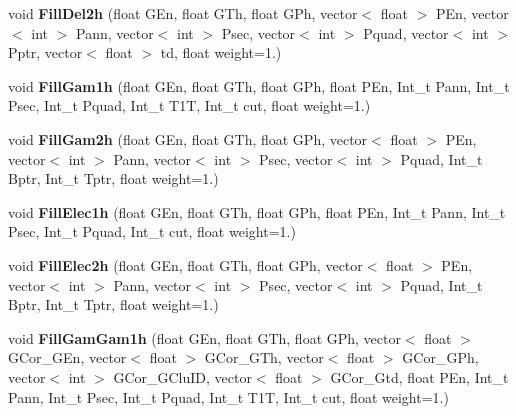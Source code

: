 \begin{DoxyCompactItemize}
\item 
\mbox{\label{classhists_a2129f29167f7fdb68978412d81030844}} 
void {\bfseries Fill\+Del2h} (float G\+En, float G\+Th, float G\+Ph, vector$<$ float $>$ P\+En, vector$<$ int $>$ Pann, vector$<$ int $>$ Psec, vector$<$ int $>$ Pquad, vector$<$ int $>$ Pptr, vector$<$ float $>$ td, float weight=1.)
\item 
\mbox{\label{classhists_af555a97407e075689f176db774c87da3}} 
void {\bfseries Fill\+Gam1h} (float G\+En, float G\+Th, float G\+Ph, float P\+En, Int\+\_\+t Pann, Int\+\_\+t Psec, Int\+\_\+t Pquad, Int\+\_\+t T1T, Int\+\_\+t cut, float weight=1.)
\item 
\mbox{\label{classhists_a37e85d4eeab8262c6809d003d83d220e}} 
void {\bfseries Fill\+Gam2h} (float G\+En, float G\+Th, float G\+Ph, vector$<$ float $>$ P\+En, vector$<$ int $>$ Pann, vector$<$ int $>$ Psec, vector$<$ int $>$ Pquad, Int\+\_\+t Bptr, Int\+\_\+t Tptr, float weight=1.)
\item 
\mbox{\label{classhists_a5c04c8d7cdb40e45f7ba00464c6835e1}} 
void {\bfseries Fill\+Elec1h} (float G\+En, float G\+Th, float G\+Ph, float P\+En, Int\+\_\+t Pann, Int\+\_\+t Psec, Int\+\_\+t Pquad, Int\+\_\+t cut, float weight=1.)
\item 
\mbox{\label{classhists_a1734b966a54b280c42524291ddcd60c8}} 
void {\bfseries Fill\+Elec2h} (float G\+En, float G\+Th, float G\+Ph, vector$<$ float $>$ P\+En, vector$<$ int $>$ Pann, vector$<$ int $>$ Psec, vector$<$ int $>$ Pquad, Int\+\_\+t Bptr, Int\+\_\+t Tptr, float weight=1.)
\item 
\mbox{\label{classhists_ae7189f12a2d600e8b58affcdc4816638}} 
void {\bfseries Fill\+Gam\+Gam1h} (float G\+En, float G\+Th, float G\+Ph, vector$<$ float $>$ G\+Cor\+\_\+\+G\+En, vector$<$ float $>$ G\+Cor\+\_\+\+G\+Th, vector$<$ float $>$ G\+Cor\+\_\+\+G\+Ph, vector$<$ int $>$ G\+Cor\+\_\+\+G\+Clu\+ID, vector$<$ float $>$ G\+Cor\+\_\+\+Gtd, float P\+En, Int\+\_\+t Pann, Int\+\_\+t Psec, Int\+\_\+t Pquad, Int\+\_\+t T1T, Int\+\_\+t cut, float weight=1.)
\item 
\mbox{\label{classhists_a77c5d523f6064a42098c029ffaa0fbbc}} 

\end{DoxyCompactItemize}

